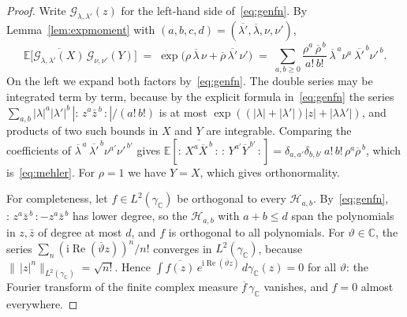 \documentclass[11pt,reqno]{amsart}
\theoremstyle{definition}
\numberwithin{equation}{section}
\newcommand{\C}{\mathbb{C}}
\newcommand{\E}{\mathbb{E}}
\newcommand{\ii}{\mathrm{i}}
\newcommand{\gC}{\gamma_{\C}}
\newcommand{\wick}[1]{{:}\,#1\,{:}}
\DeclareMathOperator{\RePart}{Re}
\begin{document}
\begin{proof}
Write $\mathcal{G}_{\lambda,\lambda'}(z)$ for the left-hand side of~\eqref{eq:genfn}. By Lemma~\ref{lem:expmoment} with $(a,b,c,d)=(\overline{\lambda'},\overline{\lambda},\nu,\nu')$,
\[
  \E\bigl[\overline{\mathcal{G}_{\lambda,\lambda'}(X)}\,\mathcal{G}_{\nu,\nu'}(Y)\bigr]
  \;=\; \exp\bigl(\rho\,\overline{\lambda}\,\nu+\overline{\rho}\,\overline{\lambda'}\,\nu'\bigr)
  \;=\; \sum_{a,b\ge0}\frac{\rho^a\,\overline{\rho}^{\,b}}{a!\,b!}\ \overline{\lambda}^{\,a}\nu^a\ \overline{\lambda'}^{\,b}\nu'^{\,b}.
\]
On the left we expand both factors by~\eqref{eq:genfn}. The double series may be integrated term by term, because by the explicit formula in~\eqref{eq:genfn} the series $\sum_{a,b}|\lambda|^a|\lambda'|^b\,|\wick{z^a\bar z^{\,b}}|/(a!\,b!)$ is at most $\exp((|\lambda|+|\lambda'|)|z|+|\lambda\lambda'|)$, and products of two such bounds in $X$ and $Y$ are integrable. Comparing the coefficients of $\overline{\lambda}^{\,a}\,\overline{\lambda'}^{\,b}\nu^{a'}\nu'^{\,b'}$ gives $\E[\overline{\wick{X^a\overline{X}^{\,b}}}\,\wick{Y^{a'}\overline{Y}^{\,b'}}]=\delta_{a,a'}\delta_{b,b'}\,a!\,b!\,\rho^a\overline{\rho}^{\,b}$, which is~\eqref{eq:mehler}. For $\rho=1$ we have $Y=X$, which gives orthonormality.

For completeness, let $f\in L^2(\gC)$ be orthogonal to every $\mathcal{H}_{a,b}$. By~\eqref{eq:genfn}, $\wick{z^a\bar z^{\,b}}-z^a\bar z^{\,b}$ has lower degree, so the $\mathcal{H}_{a,b}$ with $a+b\le d$ span the polynomials in $z,\bar z$ of degree at most $d$, and $f$ is orthogonal to all polynomials. For $\vartheta\in\C$, the series $\sum_n(\ii\RePart(\overline{\vartheta}z))^n/n!$ converges in $L^2(\gC)$, because $\|\,|z|^n\|_{L^2(\gC)}=\sqrt{n!}$. Hence $\int \overline{f(z)}\,e^{\ii\RePart(\overline{\vartheta}z)}\,d\gC(z)=0$ for all $\vartheta$: the Fourier transform of the finite complex measure $\overline{f}\,\gC$ vanishes, and $f=0$ almost everywhere.
\end{proof}
\end{document}
